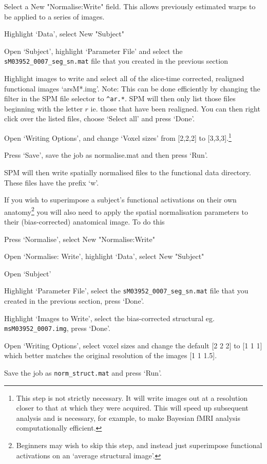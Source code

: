 \bi
\item{Select a New "Normalise:Write" field. This allows previously estimated warps to be applied to a series of images.}
\item{Highlight `Data', select New "Subject"}
\item{Open `Subject', highlight `Parameter File' and select the \verb!sM03952_0007_seg_sn.mat! file that you created in the previous section}
\item{Highlight images to write and select all of the slice-time corrected, realigned functional images `arsM*.img'. Note: This can be done efficiently by changing the filter in the SPM file selector to \verb!^ar.*!. SPM will then only list those files beginning with the letter $r$ ie. those that have been realigned. You can then right click over the listed files, choose `Select all' and press `Done'.}
\item{Open `Writing Options', and change `Voxel sizes' from [2,2,2] to [3,3,3].\footnote{This step is not strictly necessary. It will write images out at a resolution closer to that at which they were acquired. This will speed up subsequent analysis and is necessary, for example, to make Bayesian fMRI analysis computationally efficient.}}
\item{Press `Save', save the job as normalise.mat and then press `Run'.}
\ei

SPM will then write spatially normalised files to the functional data directory. These files have the prefix `w'.

If you wish to superimpose a subject's functional activations on their own anatomy\footnote{Beginners may wish to skip this step, and instead just superimpose functional activations on an `average structural image'.} you will also need to apply the spatial normalisation parameters to their (bias-corrected) anatomical image. To do this

\bi
\item{Press `Normalise', select New "Normalise:Write"}
\item{Open `Normalise: Write', highlight `Data', select New "Subject"}
\item{Open `Subject'}
\item{Highlight `Parameter File', select the \verb!sM03952_0007_seg_sn.mat! file that you created in the previous section, press `Done'.}
\item{Highlight `Images to Write', select the bias-corrected structural eg. \verb!msM03952_0007.img!, press `Done'.}
\item{Open `Writing Options', select voxel sizes and change the default [2 2 2] to [1 1 1] which better matches the original resolution of the images [1 1 1.5].}
\item{Save the job as \verb!norm_struct.mat! and press `Run'}.
\ei

